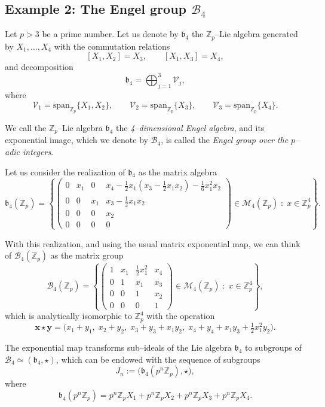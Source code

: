 \documentclass[12pt, reqno]{amsart}
\newcommand{\1}{\mathds{1}}
\begin{document}
\subsection{Example 2: The Engel group $\mathcal{B}_4$}Let $p>3$ be a prime number. Let us denote by $\mathfrak{b}_4$ the $\mathbb{Z}_p$--Lie
algebra generated by $X_1,\dots,X_4$ with the commutation relations
\[
[X_1,X_2]=X_3, \qquad [X_1,X_3]=X_4,
\]
and decomposition
\[
\mathfrak{b}_4=\bigoplus_{j=1}^{3}\mathcal{V}_j,
\]
where
\[
\mathcal{V}_1=\mathrm{span}_{\mathbb{Z}_p}\{X_1,X_2\},\qquad
\mathcal{V}_2=\mathrm{span}_{\mathbb{Z}_p}\{X_3\},\qquad
\mathcal{V}_3=\mathrm{span}_{\mathbb{Z}_p}\{X_4\}.
\]

We call the $\mathbb{Z}_p$--Lie algebra $\mathfrak{b}_4$ the \emph{4--dimensional Engel algebra},
and its exponential image, which we denote by $\mathcal{B}_4$, is called the
\emph{Engel group over the $p$--adic integers}.

Let us consider the realization of $\mathfrak{b}_4$ as the matrix algebra
\[
\mathfrak{b}_4(\mathbb{Z}_p)
=
\left\{
\begin{pmatrix}
0 & x_1 & 0 & x_4-\frac12 x_1\!\left(x_3-\frac12 x_1x_2\right)-\frac16 x_1^2x_2 \\
0 & 0 & x_1 & x_3-\frac12 x_1x_2 \\
0 & 0 & 0 & x_2 \\
0 & 0 & 0 & 0
\end{pmatrix}
\in \mathcal{M}_4(\mathbb{Z}_p)
\;:\;
x\in\mathbb{Z}_p^{4}
\right\}.
\]

With this realization, and using the usual matrix exponential map, we can think
of $\mathcal{B}_4(\mathbb{Z}_p)$ as the matrix group
\[
\mathcal{B}_4(\mathbb{Z}_p)
=
\left\{
\begin{pmatrix}
1 & x_1 & \tfrac12 x_1^2 & x_4 \\
0 & 1 & x_1 & x_3 \\
0 & 0 & 1 & x_2 \\
0 & 0 & 0 & 1
\end{pmatrix}
\in \mathcal{M}_4(\mathbb{Z}_p)
\;:\;
x\in\mathbb{Z}_p^{4}
\right\},
\]
which is analytically isomorphic to $\mathbb{Z}_p^4$ with the operation
\[
\mathbf{x}\star\mathbf{y}
=
\bigl(
x_1+y_1,\;
x_2+y_2,\;
x_3+y_3+x_1y_2,\;
x_4+y_4+x_1y_3+\tfrac12 x_1^2y_2
\bigr).
\]

The exponential map transforms sub--ideals of the Lie algebra $\mathfrak{b}_4$
to subgroups of $\mathcal{B}_4\simeq(\mathfrak{b}_4,\star)$, which can be endowed
with the sequence of subgroups
\[
J_n := \bigl(\mathfrak{b}_4(p^n\mathbb{Z}_p),\star\bigr),
\]
where
\[
\mathfrak{b}_4(p^n\mathbb{Z}_p)
=
p^n\mathbb{Z}_pX_1
+
p^n\mathbb{Z}_pX_2
+
p^n\mathbb{Z}_pX_3
+
p^n\mathbb{Z}_pX_4 .
\]
\end{document}
